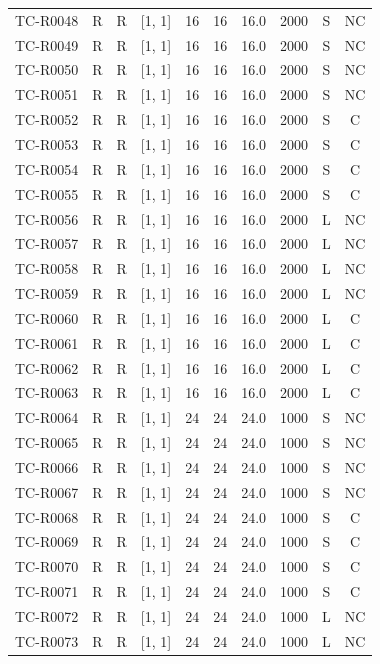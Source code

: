 \begin{longtable}{lccccccccc}
TC-R0048 & R & R & [1, 1] & 16 & 16 & 16.0 & 2000 & S & NC \\
TC-R0049 & R & R & [1, 1] & 16 & 16 & 16.0 & 2000 & S & NC \\
TC-R0050 & R & R & [1, 1] & 16 & 16 & 16.0 & 2000 & S & NC \\
TC-R0051 & R & R & [1, 1] & 16 & 16 & 16.0 & 2000 & S & NC \\
TC-R0052 & R & R & [1, 1] & 16 & 16 & 16.0 & 2000 & S & C \\
TC-R0053 & R & R & [1, 1] & 16 & 16 & 16.0 & 2000 & S & C \\
TC-R0054 & R & R & [1, 1] & 16 & 16 & 16.0 & 2000 & S & C \\
TC-R0055 & R & R & [1, 1] & 16 & 16 & 16.0 & 2000 & S & C \\
TC-R0056 & R & R & [1, 1] & 16 & 16 & 16.0 & 2000 & L & NC \\
TC-R0057 & R & R & [1, 1] & 16 & 16 & 16.0 & 2000 & L & NC \\
TC-R0058 & R & R & [1, 1] & 16 & 16 & 16.0 & 2000 & L & NC \\
TC-R0059 & R & R & [1, 1] & 16 & 16 & 16.0 & 2000 & L & NC \\
TC-R0060 & R & R & [1, 1] & 16 & 16 & 16.0 & 2000 & L & C \\
TC-R0061 & R & R & [1, 1] & 16 & 16 & 16.0 & 2000 & L & C \\
TC-R0062 & R & R & [1, 1] & 16 & 16 & 16.0 & 2000 & L & C \\
TC-R0063 & R & R & [1, 1] & 16 & 16 & 16.0 & 2000 & L & C \\
TC-R0064 & R & R & [1, 1] & 24 & 24 & 24.0 & 1000 & S & NC \\
TC-R0065 & R & R & [1, 1] & 24 & 24 & 24.0 & 1000 & S & NC \\
TC-R0066 & R & R & [1, 1] & 24 & 24 & 24.0 & 1000 & S & NC \\
TC-R0067 & R & R & [1, 1] & 24 & 24 & 24.0 & 1000 & S & NC \\
TC-R0068 & R & R & [1, 1] & 24 & 24 & 24.0 & 1000 & S & C \\
TC-R0069 & R & R & [1, 1] & 24 & 24 & 24.0 & 1000 & S & C \\
TC-R0070 & R & R & [1, 1] & 24 & 24 & 24.0 & 1000 & S & C \\
TC-R0071 & R & R & [1, 1] & 24 & 24 & 24.0 & 1000 & S & C \\
TC-R0072 & R & R & [1, 1] & 24 & 24 & 24.0 & 1000 & L & NC \\
TC-R0073 & R & R & [1, 1] & 24 & 24 & 24.0 & 1000 & L & NC \\

\end{longtable}
